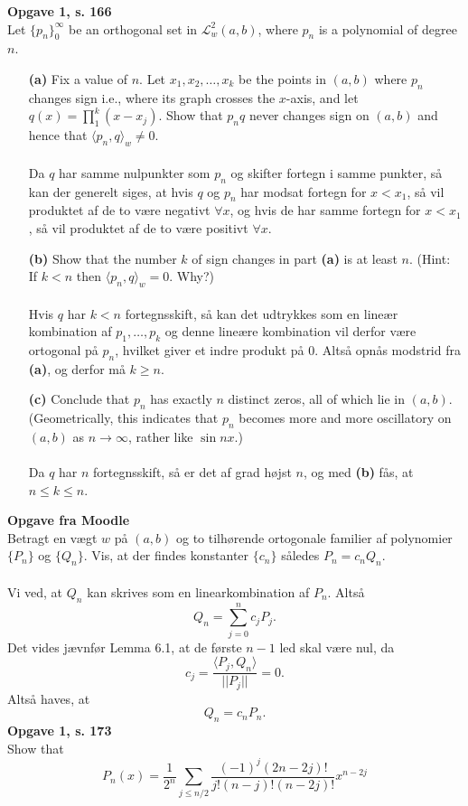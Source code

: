 \documentclass[12pt,a4paper,draft]{report}
\author{Frederik Appel Vardinghus-Nielsen}
\begin{document}
\noindent\textbf{Opgave 1, s. 166}\\
Let $\{p_n\}_0^{\infty}$ be an orthogonal set in $\mathcal{L}_w^2(a,b)$, where $p_n$ is a polynomial of degree $n$.
\begin{itemize}
\item[\textbf{(a)}] Fix a value of $n$. Let $x_1,x_2,\ldots,x_k$ be the points in $(a,b)$ where $p_n$ changes sign i.e., where its graph crosses the $x$-axis, and let $q(x)=\prod_1^k(x-x_j)$. Show that $p_nq$ never changes sign on $(a,b)$ and hence that $\langle p_n,q\rangle_w\neq0$.\\\\
Da $q$ har samme nulpunkter som $p_n$ og skifter fortegn i samme punkter, så kan der generelt siges, at hvis $q$ og $p_n$ har modsat fortegn for $x<x_1$, så vil produktet af de to være negativt $\forall x$, og hvis de har samme fortegn for $x<x_1$, så vil produktet af de to være positivt $\forall x$.
\item[\textbf{(b)}] Show that the number $k$ of sign changes in part \textbf{(a)} is at least $n$. (Hint: If $k<n$ then $\langle p_n,q\rangle_w=0$. Why?)\\\\
Hvis $q$ har $k<n$ fortegnsskift, så kan det udtrykkes som en lineær kombination af $p_1,\ldots,p_k$ og denne lineære kombination vil derfor være ortogonal på $p_n$, hvilket giver et indre produkt på 0. Altså opnås modstrid fra \textbf{(a)}, og derfor må $k\geq n$.
\item[\textbf{(c)}] Conclude that $p_n$ has exactly $n$ distinct zeros, all of which lie in $(a,b)$. (Geometrically, this indicates that $p_n$ becomes more and more oscillatory on $(a,b)$ as $n\to\infty$, rather like $\sin nx$.)\\\\
Da $q$ har $n$ fortegnsskift, så er det af grad højst $n$, og med \textbf{(b)} fås, at 
$n\leq k\leq n$.
\end{itemize}
\textbf{Opgave fra Moodle}\\
Betragt en vægt $w$ på $(a,b)$ og to tilhørende ortogonale familier af polynomier $\{P_n\}$ og $\{Q_n\}$. Vis, at der findes konstanter $\{c_n\}$ således $P_n=c_nQ_n$.\\\\
Vi ved, at $Q_n$ kan skrives som en linearkombination af $P_n$. Altså
\begin{equation}
Q_n=\sum_{j=0}^{n}c_jP_j.
\end{equation}
Det vides jævnfør Lemma 6.1, at de første $n-1$ led skal være nul, da
\begin{equation}
c_j=\frac{\langle P_j,Q_n\rangle}{||P_j||}=0.
\end{equation}
Altså haves, at
\begin{equation}
Q_n=c_nP_n.
\end{equation}
\textbf{Opgave 1, s. 173}\\
Show that
\begin{equation}
P_n(x)=\frac{1}{2^n}\sum_{j\leq n/2}\frac{(-1)^j(2n-2j)!}{j!(n-j)!(n-2j)!}x^{n-2j}
\end{equation}
\end{document}

